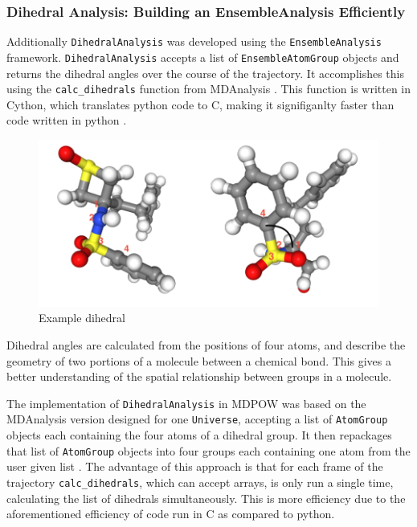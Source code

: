 \documentclass{article}[letterpaper, margins=1in, 12pt]
\begin{document}
\subsubsection{Dihedral Analysis: Building an EnsembleAnalysis Efficiently}

Additionally \texttt{DihedralAnalysis} was developed using the \texttt{EnsembleAnalysis} framework. \texttt{DihedralAnalysis} accepts a list of \texttt{EnsembleAtomGroup} objects and returns the dihedral angles over the course of the trajectory. It accomplishes this using the \lstinline{calc_dihedrals} function from MDAnalysis \cite{michaud-agrawal_mdanalysis_2011, gowers_mdanalysis_2016}. This function is written in Cython, which translates python code to C, making it signifiganlty faster than code written in python \cite{Mull2018}. 

\begin{figure}[h]
    \centering
	\includegraphics[scale=0.5]{dihedral}
	\caption{Example dihedral}
	\label{fig:dihedral}
\end{figure}

Dihedral angles are calculated from the positions of four atoms, and describe the geometry of two portions of a molecule between a chemical bond. This gives a better understanding of the spatial relationship between groups in a molecule.   

The implementation of \texttt{DihedralAnalysis} in MDPOW was based on the MDAnalysis version designed for one \texttt{Universe}, accepting a list of \texttt{AtomGroup} objects each containing the four atoms of a dihedral group. It then repackages that list of \texttt{AtomGroup} objects into four groups each containing one atom from the user given list \cite{Mull2018}. The advantage of this approach is that for each frame of the trajectory \lstinline{calc_dihedrals}, which can accept arrays, is only run a single time, calculating the list of dihedrals simultaneously. This is more efficiency due to the aforementioned efficiency of code run in C as compared to python.
\end{document}

